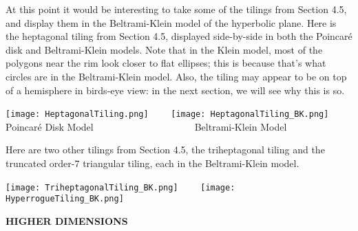 \documentclass[leqno]{book}
\begin{document}
At this point it would be interesting to take some of the tilings from Section 4.5, and display them in the Beltrami-Klein model of the hyperbolic plane.
Here is the heptagonal tiling from Section 4.5, displayed side-by-side in both the Poincar\'e disk and Beltrami-Klein models.  Note that in the Klein model, most of the polygons near the rim look closer to flat ellipses; this is because that's what circles are in the Beltrami-Klein model.  Also, the tiling may appear to be on top of a hemisphere in birds-eye view: in the next section, we will see why this is so.
\begin{center}
\texttt{[image: HeptagonalTiling.png]}~~~~
\texttt{[image: HeptagonalTiling\_BK.png]}\\
Poincar\'e Disk Model~~~~~~~~~~~~~~~~~~~~~Beltrami-Klein Model
\end{center}
Here are two other tilings from Section 4.5, the triheptagonal tiling and the truncated order-$7$ triangular tiling, each in the Beltrami-Klein model.
\begin{center}
\texttt{[image: TriheptagonalTiling\_BK.png]}~~~~
\texttt{[image: HyperrogueTiling\_BK.png]}\\
\end{center}

\noindent\textbf{HIGHER DIMENSIONS}\\
\end{document}
